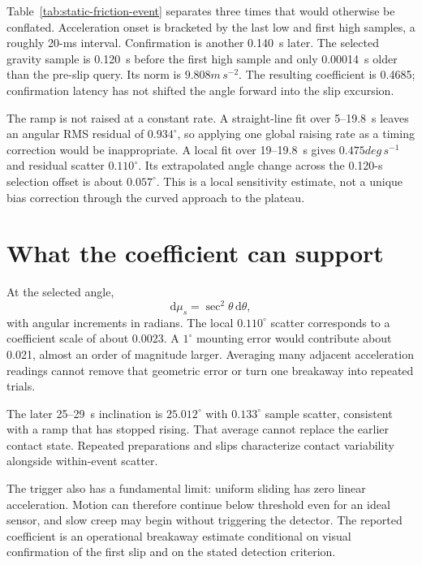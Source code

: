 Table~\ref{tab:static-friction-event} separates three times that would otherwise be conflated. Acceleration onset is bracketed by the last low and first high samples, a roughly 20-ms interval. Confirmation is another 0.140~s later. The selected gravity sample is 0.120~s before the first high sample and only 0.00014~s older than the pre-slip query. Its norm is $9.808\unit{m\,s^{-2}}$. The resulting coefficient is 0.4685; confirmation latency has not shifted the angle forward into the slip excursion.

The ramp is not raised at a constant rate. A straight-line fit over 5--19.8~s leaves an angular RMS residual of $0.934^\circ$, so applying one global raising rate as a timing correction would be inappropriate. A local fit over 19--19.8~s gives $0.475\unit{deg\,s^{-1}}$ and residual scatter $0.110^\circ$. Its extrapolated angle change across the 0.120-s selection offset is about $0.057^\circ$. This is a local sensitivity estimate, not a unique bias correction through the curved approach to the plateau.

\section{What the coefficient can support}
At the selected angle,
\begin{equation}
 \mathrm d\mu_s=\sec^2\theta\,\mathrm d\theta,
 \label{eq:static-friction-sensitivity}
\end{equation}
with angular increments in radians. The local $0.110^\circ$ scatter corresponds to a coefficient scale of about 0.0023. A $1^\circ$ mounting error would contribute about 0.021, almost an order of magnitude larger. Averaging many adjacent acceleration readings cannot remove that geometric error or turn one breakaway into repeated trials.

The later 25--29~s inclination is $25.012^\circ$ with $0.133^\circ$ sample scatter, consistent with a ramp that has stopped rising. That average cannot replace the earlier contact state. Repeated preparations and slips characterize contact variability alongside within-event scatter.

The trigger also has a fundamental limit: uniform sliding has zero linear acceleration. Motion can therefore continue below threshold even for an ideal sensor, and slow creep may begin without triggering the detector. The reported coefficient is an operational breakaway estimate conditional on visual confirmation of the first slip and on the stated detection criterion.
